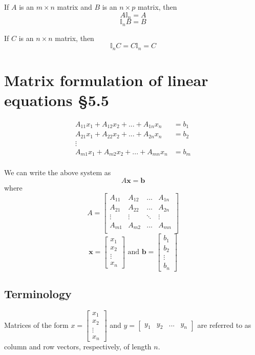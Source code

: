 \documentclass[11pt]{article}
\renewcommand{\vec}[1]{\mathbf{#1}}
\begin{document}
If $A$ is an $m \times n$ matrix and $B$ is an $n \times p$ matrix, then
\[ A \mathbb{I}_n = A \]
\[ \mathbb{I}_n B = B \]

If $C$ is an $n \times n$ matrix, then
\[ \mathbb{I}_n C = C \mathbb{I}_n = C \]

\section{Matrix formulation of linear equations §5.5}
\begin{align*}
A_{11}x_1 + A_{12}x_2  + ... + A_{1n}x_n &= b_1 \\
A_{21}x_1 + A_{22}x_2  + ... + A_{2n}x_n &= b_2 \\
\vdots \\
A_{m1}x_1 + A_{m2}x_2  + ... + A_{mn}x_n &= b_m \\
\end{align*}

We can write the above system as
\[ A \vec{x} = \vec{b} \]
where
\[ 
A = \begin{bmatrix}
A_{11} & A_{12} & ... & A_{1n} \\
A_{21} & A_{22} & ... & A_{2n} \\
\vdots & \vdots & \ddots & \vdots \\
A_{m1} & A_{m2} & ... & A_{mn} \\
\end{bmatrix}
\]
\[ 
\vec{x} = \begin{bmatrix}
x_1 \\
x_2 \\
\vdots \\
x_n
\end{bmatrix}
\text{ and } \vec{b} = \begin{bmatrix}
b_1 \\
b_2 \\
\vdots \\
b_n
\end{bmatrix}
\]

\subsection{Terminology}
Matrices of the form $\displaystyle{ 
x = \begin{bmatrix}
x_1 \\
x_2 \\
\vdots \\
x_n
\end{bmatrix} }$ and $y = \begin{bmatrix}
y_1 & y_2 & ... & y_n
\end{bmatrix}$ are referred to as column and row vectors, respectively, of length $n$.
\end{document}
